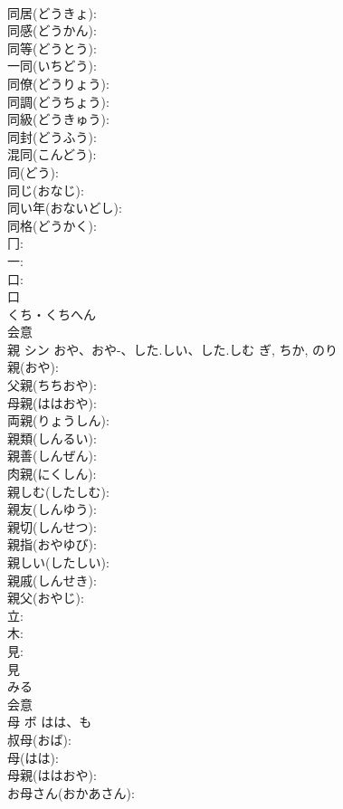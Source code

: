 \documentclass[8pt]{extreport}
\begin{document}
\begin{CJK}{UTF8}{min}
\\	同居(どうきょ): 
\\	同感(どうかん): 
\\	同等(どうとう): 
\\	一同(いちどう): 
\\	同僚(どうりょう): 
\\	同調(どうちょう): 
\\	同級(どうきゅう): 
\\	同封(どうふう): 
\\	混同(こんどう): 
\\	同(どう): 
\\	同じ(おなじ): 
\\	同い年(おないどし): 
\\	同格(どうかく): 
\\	冂: 
\\	一: 
\\	口: 
\\	口	
\\	くち・くちへん	
\\	会意 
\\	親	シン	おや、おや-、した.しい、した.しむ	ぎ, ちか, のり	
\\	親(おや): 
\\	父親(ちちおや): 
\\	母親(ははおや): 
\\	両親(りょうしん): 
\\	親類(しんるい): 
\\	親善(しんぜん): 
\\	肉親(にくしん): 
\\	親しむ(したしむ): 
\\	親友(しんゆう): 
\\	親切(しんせつ): 
\\	親指(おやゆび): 
\\	親しい(したしい): 
\\	親戚(しんせき): 
\\	親父(おやじ): 
\\	立: 
\\	木: 
\\	見: 
\\	見	
\\	みる	
\\	会意 
\\	母	ボ	はは、も		
\\	叔母(おば): 
\\	母(はは): 
\\	母親(ははおや): 
\\	お母さん(おかあさん): 

\end{CJK}
\end{document}
